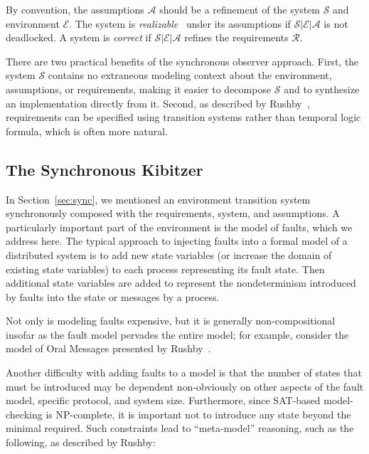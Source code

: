 \documentclass{llncs/llncs}
\newcommand{\lee}[1]{ } %
\newcommand{\lee}[1]{ {\color{blue}$<$lee: #1$>$} } %
\begin{document}
By convention, the assumptions $\mathcal{A}$ should be a refinement of the system $\mathcal{S}$ and environment $\mathcal{E}$. The system is \emph{realizable}~\cite{} under its assumptions if $\mathcal{S} | \mathcal{E} | \mathcal{A}$ is not deadlocked. A system is \emph{correct} if $\mathcal{S} | \mathcal{E} | \mathcal{A}$ refines the requirements $\mathcal{R}$.

There are two practical benefits of the synchronous observer approach. First, the system $\mathcal{S}$ contains no extraneous modeling context about the environment, assumptions, or requirements, making it easier to decompose $\mathcal{S}$ and to synthesize an implementation directly from it. Second, as described by Rushby~\cite{}, requirements can be specified using transition systems rather than temporal logic formula, which is often more natural.

\subsection{The Synchronous Kibitzer}\label{sec:kibitzer}
\lee{We use synchronous composition to implement fault injection. Mention in the intro. This is fundamental to the model, so we have section devoted to it.}
In Section~\ref{sec:sync}, we mentioned an environment transition system synchronously composed with the requirements, system, and assumptions. A particularly important part of the environment is the model of faults, which we address here. The typical approach to injecting faults into a formal model of a distributed system is to add new state variables (or increase the domain of existing state variables) to each process representing its fault state. Then additional state variables are added to represent the nondeterminism introduced by faults into the state or messages by a process.


Not only is modeling faults expensive, but it is generally non-compositional insofar as the fault model pervades the entire model; for example, consider the model of Oral Messages presented by Rushby~\cite{}.

Another difficulty with adding faults to a model is that the number of states that must be introduced may be dependent non-obviously on other aspects of the fault model, specific protocol, and system size. Furthermore, since SAT-based model-checking is NP-complete, it is important not to introduce any state beyond the minimal required. Such constraints lead to ``meta-model'' reasoning, such as the following, as described by Rushby:
\end{document}
